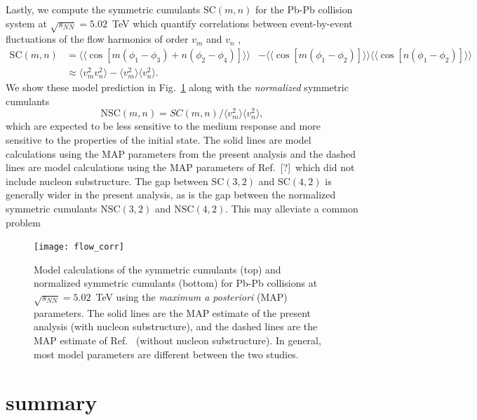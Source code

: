\documentclass[aps,prc,reprint,amsmath,nofootinbib]{revtex4-1}
\newcommand{\sqrts}{\sqrt{s_{NN}}}
\newcommand{\note}{\textcolor{theblue}{[?]}}
\def\\#1{ #1}
\begin{document}
Lastly, we compute the symmetric cumulants $\mathrm{SC}(m,n)$ for the Pb-Pb collision system at $\sqrts=5.02$~TeV which quantify correlations between event-by-event fluctuations of the flow harmonics of order $v_m$ and $v_n$ \cite{Bilandzic:2013kga, ALICE:2016kpq},
\begin{align}
  \mathrm{SC}(m, n) &= \langle\langle \cos[m(\phi_1 - \phi_3) + n(\phi_2-\phi_4)]\rangle\rangle \nonumber \\
\nonumber &- \langle\langle\cos[m(\phi_1-\phi_2)]\rangle\rangle\langle\langle\cos[n(\phi_1-\phi_2)]\rangle\rangle \label{eq:scmn}\\
&\approx \langle v_m^2 v_n^2 \rangle - \langle v_m^2\rangle\langle v_n^2\rangle.
\end{align}
We show these model prediction in Fig.~\ref{fig:flow_corr} along with the \emph{normalized} symmetric cumulants
\begin{equation}
  \mathrm{NSC}(m,n) = SC(m,n)/\langle v_m^2\rangle\langle v_n^2\rangle,
\end{equation}
which are expected to be less sensitive to the medium response and more sensitive to the properties of the initial state.
The solid lines are model calculations using the MAP parameters from the present analysis and the dashed lines are model calculations using the MAP parameters of Ref.~\note\ which did not include nucleon substructure.
The gap between $\mathrm{SC}(3,2)$ and $\mathrm{SC}(4,2)$ is generally wider in the present analysis, as is the gap between the normalized symmetric cumulants $\mathrm{NSC}(3,2)$ and $\mathrm{NSC}(4,2)$.
This may alleviate a common problem

\begin{figure}
  \texttt{[image: flow\_corr]}
  \caption{Model calculations of the symmetric cumulants (top) and normalized symmetric cumulants (bottom) for Pb-Pb collisions at $\sqrts=5.02$~TeV using the \emph{maximum a posteriori} (MAP) parameters. The solid lines are the MAP estimate of the present analysis (with nucleon substructure), and the dashed lines are the MAP estimate of Ref.~\cite{Bernhard:2018hnz} (without nucleon substructure). In general, most model parameters are different between the two studies.}
  \label{fig:flow_corr}
\end{figure}

\section{summary}
\label{sec:summary}
\end{document}
